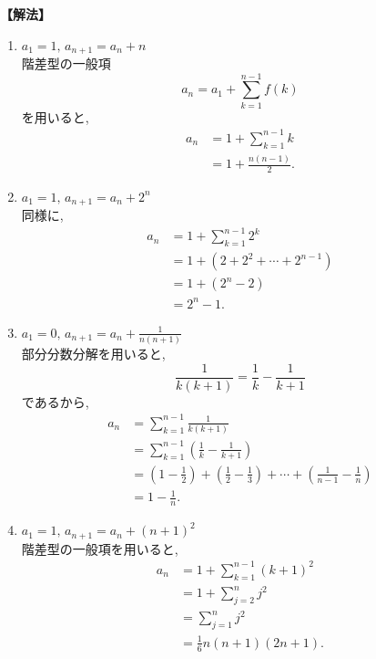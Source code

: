 \noindent\textbf{【解法】}
\begin{enumerate}[label=(\arabic*),parsep=3pt]
  \item $\displaystyle a_1=1,\,a_{n+1}=a_n+n$\\
        階差型の一般項
        \[
          a_n=a_1+\sum_{k=1}^{n-1}f(k)
        \]
        を用いると,
        \begin{align*}
          a_n
           & =1+\sum_{k=1}^{n-1}k \\
           & =1+\frac{n(n-1)}{2}.
        \end{align*}

  \item $\displaystyle a_1=1,\,a_{n+1}=a_n+2^n$\\
        同様に,
        \begin{align*}
          a_n
           & =1+\sum_{k=1}^{n-1}2^k    \\
           & =1+(2+2^2+\cdots+2^{n-1}) \\
           & =1+(2^n-2)                \\
           & =2^n-1.
        \end{align*}

  \item $\displaystyle a_1=0,\,a_{n+1}=a_n+\frac{1}{n(n+1)}$\\
        部分分数分解を用いると,
        \[
          \frac{1}{k(k+1)}
          =\frac{1}{k}-\frac{1}{k+1}
        \]
        であるから,
        \begin{align*}
          a_n
           & =\sum_{k=1}^{n-1}\frac{1}{k(k+1)}   \\
           & =\sum_{k=1}^{n-1}
          \left(\frac{1}{k}-\frac{1}{k+1}\right) \\
           & =\left(1-\frac12\right)
          +\left(\frac12-\frac13\right)
          +\cdots
          +\left(\frac{1}{n-1}-\frac1n\right)    \\
           & =1-\frac1n.
        \end{align*}

  \item $\displaystyle a_1=1,\,a_{n+1}=a_n+(n+1)^2$\\
        階差型の一般項を用いると,
        \begin{align*}
          a_n
           & =1+\sum_{k=1}^{n-1}(k+1)^2 \\
           & =1+\sum_{j=2}^{n}j^2       \\
           & =\sum_{j=1}^{n}j^2         \\
           & =\frac{1}{6}n(n+1)(2n+1).
        \end{align*}
\end{enumerate}
